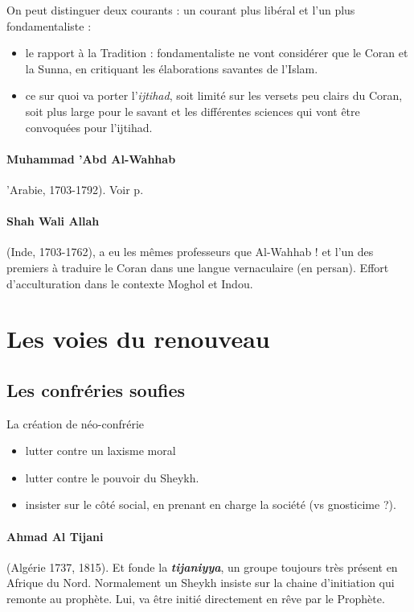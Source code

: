 On peut distinguer deux courants : un courant plus libéral et l'un plus fondamentaliste :
\begin{itemize}
    \item le rapport à la Tradition : fondamentaliste ne vont considérer que le Coran et la Sunna, en critiquant les élaborations savantes de l'Islam. 
    \item ce sur quoi va porter l'\emph{ijtihad}, soit limité sur les versets peu clairs du Coran, soit plus large pour le savant et les différentes sciences qui vont être convoquées pour l'ijtihad.
\end{itemize}


\paragraph{Muhammad 'Abd Al-Wahhab } 'Arabie, 1703-1792). Voir p. \pageref{Theol:AlWahhab}

\paragraph{Shah Wali Allah} (Inde, 1703-1762), \label{Theo:waliAllah} a eu les mêmes professeurs que Al-Wahhab ! et l'un des premiers à traduire le Coran dans une langue vernaculaire (en persan). Effort d'acculturation dans le contexte Moghol et Indou. 




 
\section{Les voies du renouveau} 
\subsection{Les confréries soufies}

La création de néo-confrérie
\begin{itemize}
    \item lutter contre un laxisme moral
    \item lutter contre le pouvoir du Sheykh.
    \item insister sur le côté social, en prenant en charge la société (vs gnosticime ?).
\end{itemize}




\paragraph{Ahmad Al Tijani} (Algérie 1737, 1815). Et fonde la \emph{\textbf{tijaniyya}}, un groupe toujours très présent en Afrique du Nord. Normalement un Sheykh insiste sur la chaine d'initiation qui remonte au prophète. Lui, va être initié directement en rêve par le Prophète.

